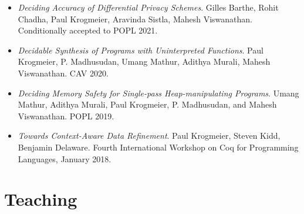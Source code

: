 \documentclass[12pt,a4paper,sans]{moderncv}        %
\newcommand{\MYhref}[3][assassinblue]{\href{#2}{\color{#1}{#3}}}%
\begin{document}
\vspace{4pt}
\begin{itemize}
\item \emph{Deciding Accuracy of Differential Privacy
    Schemes}. Gilles Barthe, Rohit Chadha, Paul Krogmeier, Aravinda
  Sistla, Mahesh Viswanathan. Conditionally accepted to POPL 2021.
  \vspace{10pt}
\item \emph{Decidable Synthesis of Programs with Uninterpreted
    Functions}.  Paul Krogmeier, P. Madhusudan, Umang Mathur, Adithya
  Murali, Mahesh Viswanathan. CAV
  2020. \MYhref{https://link.springer.com/chapter/10.1007/978-3-030-53291-8_32}{Paper.}
  \vspace{10pt}
\item \emph{Deciding Memory Safety for Single-pass Heap-manipulating
    Programs}. Umang Mathur, Adithya Murali, Paul Krogmeier,
  P. Madhusudan, and Mahesh Viswanathan. POPL 2019.
  \MYhref{https://doi.org/10.1145/3371103}{Paper.} \vspace{10pt}
\item \emph{Towards Context-Aware Data Refinement}. Paul Krogmeier,
  Steven Kidd, Benjamin Delaware. Fourth International Workshop on Coq
  for Programming Languages, January
  2018. \MYhref{https://popl18.sigplan.org/details/CoqPL-2018/4/Towards-Context-Aware-Data-Refinement}{Paper.}
\end{itemize}

\section{Teaching}
\label{sec:teaching}
\end{document}
